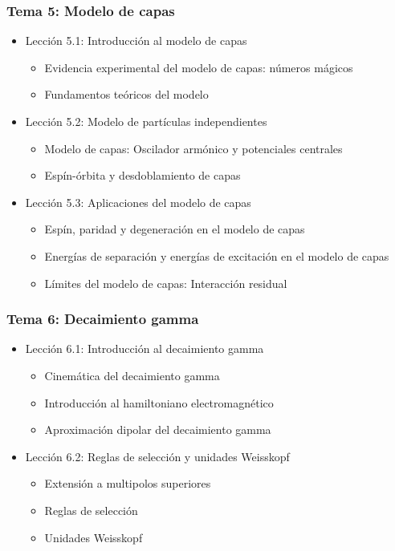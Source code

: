 \documentclass[a4paper,12pt,twoside]{article}
\begin{document}
\subsubsection*{Tema 5: Modelo de capas}
\begin{itemize}
\item Lección 5.1: Introducción al modelo de capas
\begin{itemize}
\item Evidencia experimental del modelo de capas: números mágicos
\item Fundamentos teóricos del modelo
\end{itemize}
\item Lección 5.2: Modelo de partículas independientes
\begin{itemize}
\item Modelo de capas: Oscilador armónico y potenciales centrales
\item Espín-órbita y desdoblamiento de capas
\end{itemize}
\item Lección 5.3: Aplicaciones del modelo de capas
\begin{itemize}
\item Espín, paridad y degeneración en el modelo de capas
\item Energías de separación y energías de excitación en el modelo de capas
\item Límites del modelo de capas: Interacción residual
\end{itemize}
\end{itemize}

\subsubsection*{Tema 6: Decaimiento gamma}
\begin{itemize}
\item Lección 6.1: Introducción al decaimiento gamma
\begin{itemize}
\item Cinemática del decaimiento gamma
\item Introducción al hamiltoniano electromagnético
\item Aproximación dipolar del decaimiento gamma
\end{itemize}
\item Lección 6.2: Reglas de selección y unidades Weisskopf
\begin{itemize}
\item Extensión a multipolos superiores
\item Reglas de selección
\item Unidades Weisskopf
\end{itemize}
\end{itemize}
\end{document}

